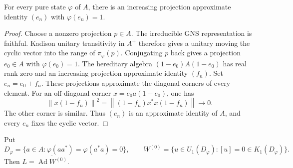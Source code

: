 \begin{lemma}\label{lem:st-state-projections}
 For every pure state $\varphi$ of $A$, there
is an increasing projection approximate identity $(e_n)$ with $\varphi(e_n)=1
$.
\end{lemma}

\begin{proof}
Choose a nonzero projection $p\in A$. The irreducible GNS representation is
faithful. Kadison unitary transitivity in $A^+$ therefore gives a unitary
moving the cyclic vector into the range of $\pi_\varphi(p)$. Conjugating $p$
back gives a projection $e_0\in A$ with $\varphi(e_0)=1$. The hereditary
algebra $(1-e_0)A(1-e_0)$ has real rank zero and an increasing projection
approximate identity $(f_n)$. Set $e_n=e_0+f_n$. These projections
approximate the diagonal corners of every element. For an off-diagonal
corner $x=e_0a(1-e_0)$, one has 
\begin{equation*}
\left\|x(1-f_n)\right\|^2 
=\left\|(1-f_n)x^*x(1-f_n)\right\|\longrightarrow0. 
\end{equation*}
The other corner is similar. Thus $(e_n)$ is an approximate identity of $A$,
and every $e_n$ fixes the cyclic vector.
\end{proof}

\begin{lemma}\label{lem:st-stable-marked-inner}
 Put 
\begin{equation*}
D_\varphi=\{a\in A:\varphi(aa^*)=\varphi(a^*a)=0\},\qquad  W^{(0)}=\{u\in
U_1(D_\varphi):[u]=0\in K_1(D_\varphi)\}. 
\end{equation*}
Then $L=\overline{\operatorname{Ad} W^{(0)}}$.
\end{lemma}

